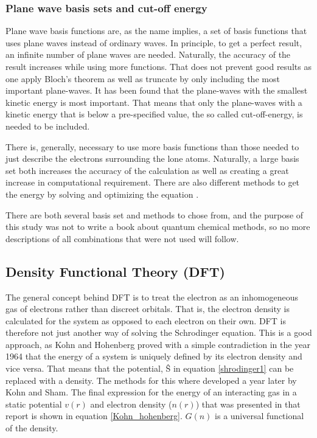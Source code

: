 \documentclass[10pt,a4paper]{article}
\begin{document}
\subsubsection{Plane wave basis sets and cut-off energy}
Plane wave basis functions are, as the name implies, a set of basis functions that uses plane waves instead of ordinary waves. In principle, to get a perfect result, an infinite number of plane waves are needed. Naturally, the accuracy of the result increases while using more functions. That does not prevent good results as one apply Bloch's theorem as well as truncate by only including the most important plane-waves. It has been found that the plane-waves with the smallest kinetic energy is most important. That means that only the plane-waves with a kinetic energy that is below a pre-specified value, the so called cut-off-energy, is needed to be included. 

There is, generally, necessary to use more basis functions than those needed to just describe the electrons surrounding the lone atoms. Naturally, a large basis set both increases the accuracy of the calculation as well as creating a great increase in computational requirement.  There are also different methods to get the energy by solving and optimizing the equation \cite{computionalprimer}.

There are both several basis set and methods to chose from, and the purpose of this study was not to write a book about quantum chemical methods, so no more descriptions of all combinations that were not used will follow.

\subsection{Density Functional Theory (DFT)}
The general concept behind DFT is to treat the electron as an inhomogeneous gas of electrons rather than discreet orbitals. That is, the electron density is calculated for the system as opposed to each electron on their own. DFT is therefore not just another way of solving the Schrodinger equation. \cite{burke} This is a good approach, as Kohn and Hohenberg proved with a simple contradiction  in the year 1964 that the energy of a system is uniquely defined by its electron density and vice versa.  That means that the potential, \^{S} in equation \ref{shrodinger1} can be replaced with a density. The methods for this where developed a year later by Kohn and Sham. The final expression for the energy of an interacting gas in a static potential $v(r)$ and electron density ($n(r)$) that was presented in that report is shown in equation \ref{Kohn_hohenberg}. $G(n)$ is a universal functional of the density.   
\end{document}
